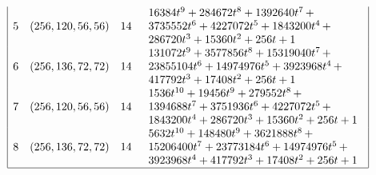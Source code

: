 \documentclass[12pt,a4paper]{article}
\begin{document}
\begin{table}[!bhpt]
\begin{align*}
\begin{array}{|cccl|}
5 &
(256, 120, 56, 56) &
14 &
\begin{array}{l}
16384t^{9} + 284672t^{8} + 1392640t^{7}
\,+
\\
 3735552t^{6} + 4227072t^{5} + 1843200t^{4}
\,+
\\
 286720t^{3} + 15360t^{2} + 256t + 1
\end{array}
\\
6 &
(256, 136, 72, 72) &
14 &
\begin{array}{l}
131072t^{9} + 3577856t^{8} + 15319040t^{7}
\,+
\\
 23855104t^{6} + 14974976t^{5} + 3923968t^{4}
\,+
\\
 417792t^{3} + 17408t^{2} + 256t + 1
\end{array}
\\
7 &
(256, 120, 56, 56) &
14 &
\begin{array}{l}
1536t^{10} + 19456t^{9} + 279552t^{8}
\,+
\\
 1394688t^{7} + 3751936t^{6} + 4227072t^{5}
\,+
\\
 1843200t^{4} + 286720t^{3} + 15360t^{2} + 256t + 1
\end{array}
\\
8 &
(256, 136, 72, 72) &
14 &
\begin{array}{l}
5632t^{10} + 148480t^{9} + 3621888t^{8}
\,+
\\
 15206400t^{7} + 23773184t^{6} + 14974976t^{5}
\,+
\\
 3923968t^{4} + 417792t^{3} + 17408t^{2} + 256t + 1
\end{array}
\\
\hline
\end{array}
\end{align*}
\caption{$[f_{8,5}]$ extended Cayley classes.}
\label{tab-c8_5_EC_classes}
\end{table}
\end{document}
